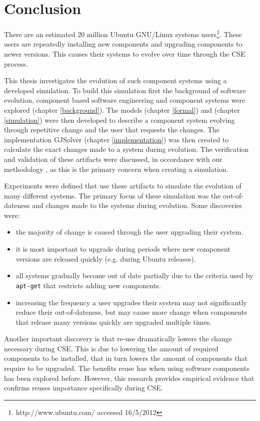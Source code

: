 \chapter{Conclusion}
\label{conclusion}
There are an estimated 20 million Ubuntu GNU/Linux systems users\footnote{http://www.ubuntu.com/ accessed 16/5/2012}.
These users are repeatedly installing new components and upgrading components to newer versions.
This causes their systems to evolve over time through the CSE process.

This thesis investigates the evolution of such component systems using a developed simulation.
To build this simulation first the background of software evolution, component based software engineering and component systems were explored (chapter \ref{background}).
The models \modelname (chapter \ref{formal}) and \usermodel (chapter \ref{simulation}) were then developed 
to describe a component system evolving through repetitive change and the user that requests the changes.
The implementation GJSolver (chapter \ref{implementation}) was then created to calculate the exact changes made to a system during evolution.
The verification and validation of these artifacts were discussed, in occordance with our methodology \cite{Law2005}, 
as this is the primary concern when creating a simulation.

Experiments were defined thst use these artifacts to simulate the evolution of many different systems.
The primary focus of these simulation was the out-of-dateness and changes made to the systems during evolution.
Some discoveries were:
\begin{itemize}
  \item the majority of change is caused through the user upgrading their system.
  \item it is most important to upgrade during periods where new component versions are released quickly (e.g. during Ubuntu releases).
  \item all systems gradually become out of date partially due to the criteria used by \texttt{apt-get} that restricts adding new components.
  \item increasing the frequency a user upgrades their system may not significantly reduce their out-of-dateness, 
  but may cause more change when components that release many versions quickly are upgraded multiple times.
\end{itemize} 

Another important discovery is that re-use dramatically lowers the change necessary during CSE.
This is due to lowering the amount of required components to be installed,
that in turn lowers the amount of components that require to be upgraded.
The benefits reuse has when using software components has been explored before\citep{Szyperski2002}.
However, this research provides empirical evidence that confirms reuses importance specifically during CSE.

